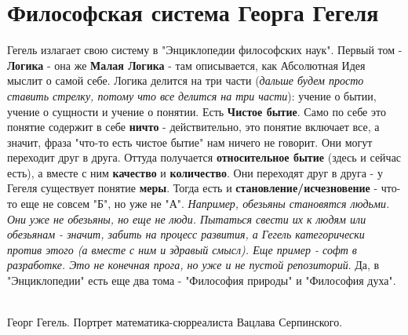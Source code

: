 \section{Философская система Георга Гегеля}
Гегель излагает свою систему в "Энциклопедии философских наук". Первый том - \textbf{Логика} - она же \textbf{Малая Логика} - там описывается, как
 Абсолютная Идея мыслит о самой себе. Логика делится на три части (\textit{дальше будем просто ставить стрелку, потому что все делится на три части}): учение о бытии, учение о сущности и учение о понятии. Есть \textbf{Чистое бытие}. Само по себе это понятие содержит в себе \textbf{ничто} - действительно, это понятие включает все, а значит, фраза "что-то есть чистое бытие" нам ничего не говорит. Они могут переходит друг в друга. Оттуда получается \textbf{относительное бытие} (здесь и сейчас есть), а вместе с ним \textbf{качество} и \textbf{количество}. Они переходят друг в друга - у Гегеля существует понятие \textbf{меры}. Тогда есть и \textbf{становление/исчезновение} - что-то еще не совсем "Б", но уже  не "А". \textit{Например, обезьяны становятся людьми. Они уже не обезьяны, но еще не люди. Пытаться свести их к людям или обезьянам - значит, забить на процесс развития, а Гегель категорически против этого (а вместе с ним и здравый смысл). Еще пример - софт в разработке. Это не конечная прога, но уже и не пустой репозиторий}. Да, в "Энциклопедии" есть еще два тома - "Философия природы" и "Философия духа". 
\begin{center}
\\
Георг Гегель. Портрет математика-сюрреалиста Вацлава Серпинского.
\end{center}

